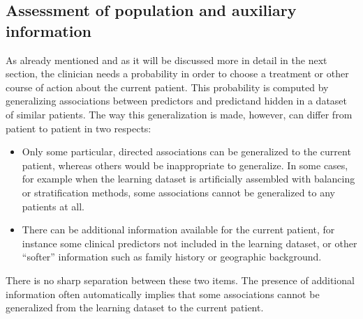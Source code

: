 \documentclass[utf8]{FrontiersinHarvard} %
\renewcommand*{\|}[1][]{\nonscript\:#1\vert\nonscript\:\mathopen{}}
\begin{document}






\newpage%
\subsection{Assessment of population and auxiliary information}
\label{sec:population_step}

As already mentioned and as it will be discussed more in detail in the next section, the clinician needs a probability in order to choose a treatment or other course of action about the current patient. This probability is computed by generalizing associations between predictors and predictand hidden in a dataset of similar patients. The way this generalization is made, however, can differ from patient to patient in two respects:
\begin{itemize}
\item Only some particular, directed associations can be generalized to the current patient, whereas others would be inappropriate to generalize. In some cases, for example when the learning dataset is artificially assembled with balancing or stratification methods, some associations cannot be generalized to any patients at all.
\item There can be additional information available for the current patient, for instance some clinical predictors not included in the learning dataset, or other \enquote{softer} information such as family history or geographic background.
\end{itemize}
There is no sharp separation between these two items. The presence of additional information often automatically implies that some associations cannot be generalized from the learning dataset to the current patient.
\end{document}
